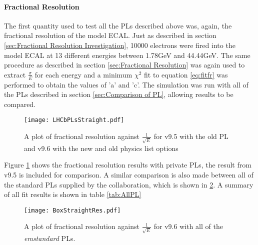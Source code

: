 \paragraph{Fractional Resolution}
The first quantity used to test all the PLs described above was, again, the fractional resolution of the model ECAL.  Just as described in section \ref{sec:Fractional Resolution Investigation}, 10000 electrons were fired into the model ECAL at 13 different energies between 1.78GeV and 44.44GeV.  The same procedure as described in section \ref{sec:Fractional Resolution} was again used to extract $\frac{\sigma}{E}$ for each energy and a minimum $\chi^2$ fit to equation \ref{eq:fitfr} was performed to obtain the values of 'a' and 'c'.  The simulation was run with all of the PLs described in section \ref{sec:Comparison of PL}, allowing results to be compared.
\begin{figure}
  \centering
  \texttt{[image: LHCbPLsStraight.pdf]}
  \caption{A plot of fractional resolution against $\frac{1}{\sqrt{E}}$ for \geant v9.5 with the old PL and v9.6 with the new and old physics list options}
  \label{fig:LHCbPLStraightFR}
\end{figure}
Figure \ref{fig:LHCbPLStraightFR} shows the fractional resolution results with \lhcb private PLs, the result from \geant v9.5 is included for comparison.  A similar comparison is also made between all of the standard PLs supplied by the \geant collaboration, which is shown in \ref{fig:BoxPLStraightFR}.  A summary of all fit results is shown in table \ref{tab:AllPL}
\begin{figure}
  \centering
  \texttt{[image: BoxStraightRes.pdf]}
  \caption{A plot of fractional resolution against $\frac{1}{\sqrt{E}}$ for \geant v9.6 with all of the \textit{emstandard} PLs.}
  \label{fig:BoxPLStraightFR}
\end{figure}

